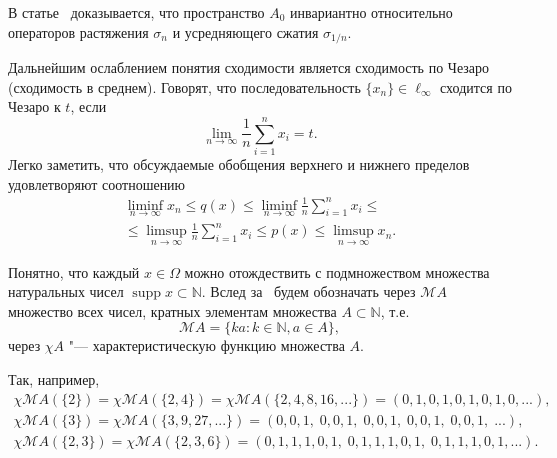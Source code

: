 \documentclass[a4paper,openbib]{report}
\renewcommand{\leq}{\leqslant}
\theoremstyle{definition}
\begin{document}
В статье~\cite{avdeev2021vestnik} доказывается,
что пространство $A_0$ инвариантно относительно операторов растяжения $\sigma_n$
и усредняющего сжатия $\sigma_{1/n}$.






Дальнейшим ослаблением понятия сходимости является сходимость по Чезаро (сходимость в среднем).
Говорят, что последовательность $\{x_n\}\in\ell_\infty$ сходится по Чезаро к $t$, если
\begin{equation}
	\lim_{n\to\infty}\frac1{n}\sum_{i=1}^n x_i = t
	.
\end{equation}
Легко заметить, что обсуждаемые обобщения верхнего и нижнего пределов удовлетворяют соотношению
\begin{multline}
	\label{eq:generalization_of_limits}
	\liminf_{n\to\infty} x_n \leq q(x) \leq \liminf_{n\to\infty}\frac1{n}\sum_{i=1}^n x_i
	\leq
	\\ \leq
	\limsup_{n\to\infty}\frac1{n}\sum_{i=1}^n x_i
	\leq p(x)
	\leq \limsup_{n\to\infty} x_n
	.
\end{multline}


Понятно, что каждый $x\in \Omega$ можно отождествить с подмножеством множества натуральных чисел
$\operatorname{supp} x \subset \mathbb{N}$.
Вслед за~\cite{hall1992behrend} будем обозначать через $\mathscr{M}A$ множество всех чисел,
кратных элементам множества $A\subset\mathbb{N}$, т.е.
\begin{equation}
	\mathscr{M}A = \{ka: k\in\mathbb{N}, a\in A\}
	,
\end{equation}
через $\chi A$ "--- характеристическую функцию множества $A$.

Так, например,
\begin{gather}
	\chi \mathscr{M}\!A(\{2\}) = \chi \mathscr{M}\!A(\{2, 4\}) = \chi \mathscr{M}\!A(\{2,4,8,16,...\})
	= (0,1,0,1,0,1,0,1,0,...),
\\
	\chi \mathscr{M}\!A(\{3\}) = \chi \mathscr{M}\!A(\{3,9,27,...\}) = (0,0,1,\;0,0,1,\;0,0,1,\;0,0,1,\;0,0,1,\;...),
\\
	\chi \mathscr{M}\!A(\{2,3\}) = \chi \mathscr{M}\!A(\{2,3,6\}) = (0,1,1,1,0,1,\;0,1,1,1,0,1,\;0,1,1,1,0,1,...).
\end{gather}
\end{document}
